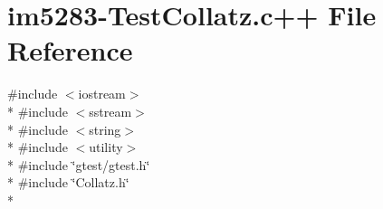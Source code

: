 \hypertarget{im5283-TestCollatz_8c_09_09}{\section{im5283-\/\-Test\-Collatz.c++ File Reference}
\label{im5283-TestCollatz_8c_09_09}
}
{\ttfamily \#include $<$iostream$>$}\\*
{\ttfamily \#include $<$sstream$>$}\\*
{\ttfamily \#include $<$string$>$}\\*
{\ttfamily \#include $<$utility$>$}\\*
{\ttfamily \#include \char`\"{}gtest/gtest.\-h\char`\"{}}\\*
{\ttfamily \#include \char`\"{}Collatz.\-h\char`\"{}}\\*
